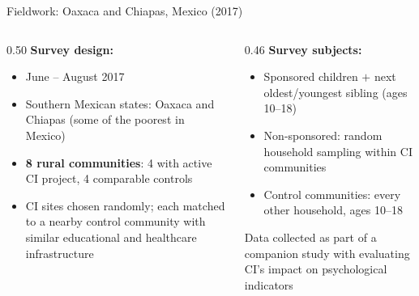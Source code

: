 \documentclass[aspectratio=169, 10pt]{beamer}
\begin{document}
\begin{frame}{Fieldwork: Oaxaca and Chiapas, Mexico (2017)}
  \begin{columns}
    \begin{column}{0.50\textwidth}
      \textbf{Survey design:}
      \begin{itemize}
        \item June -- August 2017
        \item Southern Mexican states: Oaxaca and Chiapas (some of the poorest in Mexico)
        \item \textbf{8 rural communities}: 4 with active CI project, 4 comparable controls
        \item CI sites chosen randomly; each matched to a nearby control community with similar educational and healthcare infrastructure
      \end{itemize}
    \end{column}
    \begin{column}{0.46\textwidth}
      \textbf{Survey subjects:}
      \begin{itemize}
        \item Sponsored children $+$ next oldest/youngest sibling (ages 10--18)
        \item Non-sponsored: random household sampling within CI communities
        \item Control communities: every other household, ages 10--18
      \end{itemize}
      \vspace{0.3em}
      \begin{methodbox}
        \small Data collected as part of a companion study with \citet{Ross2021} evaluating CI's impact on psychological indicators
      \end{methodbox}
    \end{column}
  \end{columns}
\end{frame}
\end{document}
